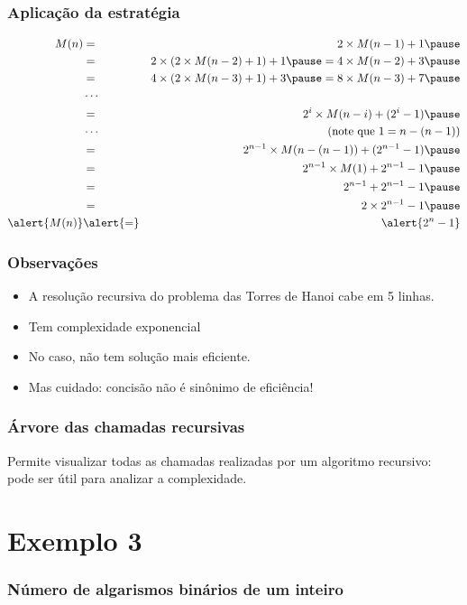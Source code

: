 \documentclass[handout]{beamer}
\begin{document}
\begin{frame}
\frametitle{Aplicação da estratégia}

\begin{eqnarray*}
M(n) & = & 2 \times M(n-1) + 1 \pause \\
     & = & 2 \times (2 \times M(n-2) + 1) + 1 \pause = 4 \times M(n-2) + 3 \pause \\
     & = & 4 \times (2 \times M(n-3) + 1) + 3 \pause = 8 \times M(n-3) + 7 \pause \\
     & \cdots & \\
     & = & 2^i \times M(n-i) + (2^i - 1) \pause \\
     & \cdots & \mbox{(note que $1 = n - (n - 1)$)}\\
     & = & 2^{n-1} \times M(n-(n-1)) + (2^{n-1} - 1) \pause \\
     & = & 2^{n-1} \times M(1) + 2^{n-1} - 1 \pause \\
     & = & 2^{n-1} + 2^{n-1} - 1 \pause \\
     & = & 2 \times 2^{n-1} - 1 \pause \\
\alert{M(n)} & \alert{=} & \alert{2^n - 1}
\end{eqnarray*}

\end{frame}

\begin{frame}
\frametitle{Observações}
\begin{itemize}
\item A resolução recursiva do problema das Torres de Hanoi cabe em 5 linhas.
\item Tem complexidade exponencial
\item No caso, não tem solução mais eficiente.
\item Mas cuidado: concisão não é sinônimo de eficiência!
\end{itemize}
\end{frame}

\begin{frame}
\frametitle{Árvore das chamadas recursivas}
Permite visualizar todas as chamadas realizadas por um algoritmo recursivo: pode ser útil para analizar a complexidade.

\begin{center}

\end{center}

\end{frame}


\section{Exemplo 3}
\begin{frame}
\frametitle{Número de algarismos binários de um inteiro}



\end{frame}
\end{document}

